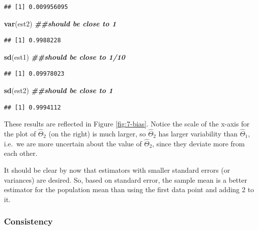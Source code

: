 \documentclass[
]{book}
\newenvironment{Shaded}{\begin{snugshade}}{\end{snugshade}}
\newcommand{\DocumentationTok}[1]{\textcolor[rgb]{0.56,0.35,0.01}{\textbf{\textit{#1}}}}
\newcommand{\FunctionTok}[1]{\textcolor[rgb]{0.13,0.29,0.53}{\textbf{#1}}}
\newcommand{\NormalTok}[1]{#1}
\begin{document}
\begin{verbatim}
## [1] 0.009956095
\end{verbatim}

\begin{Shaded}
\begin{Highlighting}[]
\FunctionTok{var}\NormalTok{(est2) }\DocumentationTok{\#\#should be close to 1}
\end{Highlighting}
\end{Shaded}

\begin{verbatim}
## [1] 0.9988228
\end{verbatim}

\begin{Shaded}
\begin{Highlighting}[]
\FunctionTok{sd}\NormalTok{(est1) }\DocumentationTok{\#\#should be close to 1/10}
\end{Highlighting}
\end{Shaded}

\begin{verbatim}
## [1] 0.09978023
\end{verbatim}

\begin{Shaded}
\begin{Highlighting}[]
\FunctionTok{sd}\NormalTok{(est2) }\DocumentationTok{\#\#should be close to 1}
\end{Highlighting}
\end{Shaded}

\begin{verbatim}
## [1] 0.9994112
\end{verbatim}

These results are reflected in Figure \ref{fig:7-bias}. Notice the scale of the x-axis for the plot of \(\hat{\Theta}_2\) (on the right) is much larger, so \(\hat{\Theta}_2\) has larger variability than \(\hat{\Theta}_1\), i.e.~we are more uncertain about the value of \(\hat{\Theta}_2\), since they deviate more from each other.

It should be clear by now that estimators with smaller standard errors (or variances) are desired. So, based on standard error, the sample mean is a better estimator for the population mean than using the first data point and adding 2 to it.

\hypertarget{consistency}{%
\subsubsection{Consistency}\label{consistency}}
\end{document}
